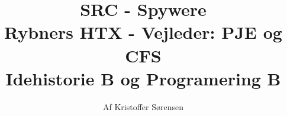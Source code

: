\title{
    SRC - Spywere \\ 
    \large{Rybners HTX - Vejleder: PJE og CFS} \\
    \small{Idehistorie B og Programering B}
}
\author{Af Kristoffer Sørensen}
\thispagestyle{empty}
\maketitle
\newpage
